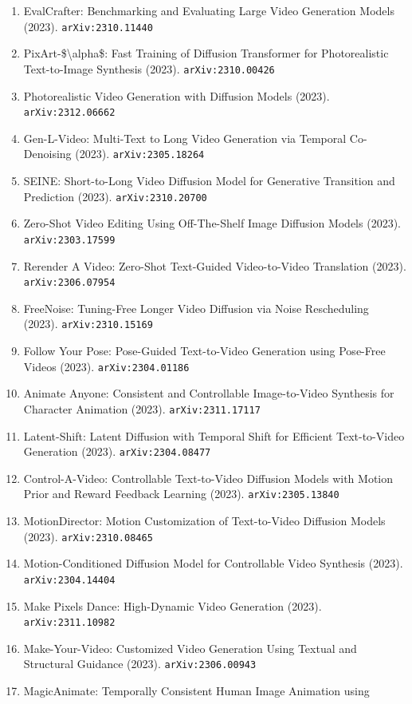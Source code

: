 \documentclass[11pt]{article}
\begin{document}
\begin{enumerate}
  \item EvalCrafter: Benchmarking and Evaluating Large Video Generation Models (2023). \texttt{arXiv:2310.11440}
  \item PixArt-\$\textbackslash{}alpha\$: Fast Training of Diffusion Transformer for
  Photorealistic Text-to-Image Synthesis (2023). \texttt{arXiv:2310.00426}
  \item Photorealistic Video Generation with Diffusion Models (2023). \texttt{arXiv:2312.06662}
  \item Gen-L-Video: Multi-Text to Long Video Generation via Temporal
  Co-Denoising (2023). \texttt{arXiv:2305.18264}
  \item SEINE: Short-to-Long Video Diffusion Model for Generative Transition and
  Prediction (2023). \texttt{arXiv:2310.20700}
  \item Zero-Shot Video Editing Using Off-The-Shelf Image Diffusion Models (2023). \texttt{arXiv:2303.17599}
  \item Rerender A Video: Zero-Shot Text-Guided Video-to-Video Translation (2023). \texttt{arXiv:2306.07954}
  \item FreeNoise: Tuning-Free Longer Video Diffusion via Noise Rescheduling (2023). \texttt{arXiv:2310.15169}
  \item Follow Your Pose: Pose-Guided Text-to-Video Generation using Pose-Free
  Videos (2023). \texttt{arXiv:2304.01186}
  \item Animate Anyone: Consistent and Controllable Image-to-Video Synthesis for
  Character Animation (2023). \texttt{arXiv:2311.17117}
  \item Latent-Shift: Latent Diffusion with Temporal Shift for Efficient
  Text-to-Video Generation (2023). \texttt{arXiv:2304.08477}
  \item Control-A-Video: Controllable Text-to-Video Diffusion Models with Motion
  Prior and Reward Feedback Learning (2023). \texttt{arXiv:2305.13840}
  \item MotionDirector: Motion Customization of Text-to-Video Diffusion Models (2023). \texttt{arXiv:2310.08465}
  \item Motion-Conditioned Diffusion Model for Controllable Video Synthesis (2023). \texttt{arXiv:2304.14404}
  \item Make Pixels Dance: High-Dynamic Video Generation (2023). \texttt{arXiv:2311.10982}
  \item Make-Your-Video: Customized Video Generation Using Textual and
  Structural Guidance (2023). \texttt{arXiv:2306.00943}
  \item MagicAnimate: Temporally Consistent Human Image Animation using

\end{enumerate}
\end{document}
